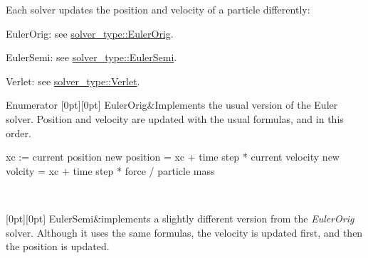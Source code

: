 Each solver updates the position and velocity of a particle differently\+:
\begin{DoxyItemize}
\item Euler\+Orig\+: see \hyperlink{namespacephysim_a09adeda29c09e651877e880d31fc9686aa1a59d5d012fd05efb1223f874f77d4b}{solver\+\_\+type\+::\+Euler\+Orig}.
\item Euler\+Semi\+: see \hyperlink{namespacephysim_a09adeda29c09e651877e880d31fc9686a1855dee0fffde2f4ed8ef6c4a0420b30}{solver\+\_\+type\+::\+Euler\+Semi}.
\item Verlet\+: see \hyperlink{namespacephysim_a09adeda29c09e651877e880d31fc9686ac1f9df543f33d8a79fb2437c853f09b9}{solver\+\_\+type\+::\+Verlet}. 
\end{DoxyItemize}\begin{DoxyEnumFields}{Enumerator}
[0pt][0pt]{}\mbox{\label{namespacephysim_a09adeda29c09e651877e880d31fc9686aa1a59d5d012fd05efb1223f874f77d4b}} 
Euler\+Orig&Implements the usual version of the Euler solver. Position and velocity are updated with the usual formulas, and in this order. \begin{DoxyVerb}xc := current position
new position = xc + time step * current velocity
new volcity = xc + time step * force / particle mass
\end{DoxyVerb}
 \\
\hline

[0pt][0pt]{}\mbox{\label{namespacephysim_a09adeda29c09e651877e880d31fc9686a1855dee0fffde2f4ed8ef6c4a0420b30}} 
Euler\+Semi&implements a slightly different version from the {\itshape Euler\+Orig} solver. Although it uses the same formulas, the velocity is updated first, and then the position is updated. \\
\hline


\end{DoxyEnumFields}
